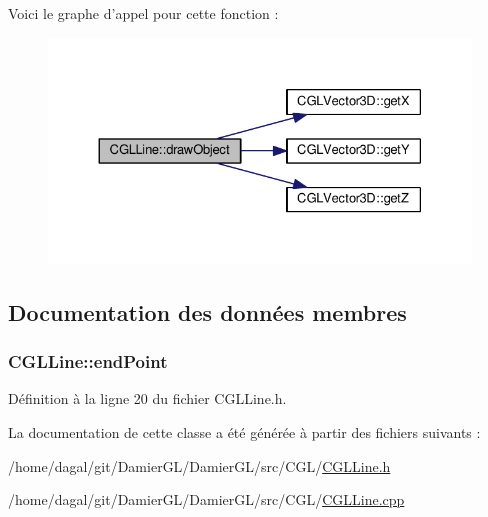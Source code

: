 Voici le graphe d'appel pour cette fonction \-:\nopagebreak
\begin{figure}[H]
\begin{center}
\leavevmode
\includegraphics[width=330pt]{d9/dfe/class_c_g_l_line_a9621fa37a8b87f06e2a67aa8bf17d957_cgraph}
\end{center}
\end{figure}




\subsection{Documentation des données membres}
\hypertarget{class_c_g_l_line_a2c4e6d2079bbac662dddf3fc137ad4d9}{
\subsubsection[{end\-Point}]{ C\-G\-L\-Line\-::end\-Point\hspace{0.3cm}{\ttfamily [protected]}}}\label{class_c_g_l_line_a2c4e6d2079bbac662dddf3fc137ad4d9}


Définition à la ligne 20 du fichier C\-G\-L\-Line.\-h.



La documentation de cette classe a été générée à partir des fichiers suivants \-:\begin{DoxyCompactItemize}
\item 
/home/dagal/git/\-Damier\-G\-L/\-Damier\-G\-L/src/\-C\-G\-L/\hyperlink{_c_g_l_line_8h}{C\-G\-L\-Line.\-h}\item 
/home/dagal/git/\-Damier\-G\-L/\-Damier\-G\-L/src/\-C\-G\-L/\hyperlink{_c_g_l_line_8cpp}{C\-G\-L\-Line.\-cpp}\end{DoxyCompactItemize}
